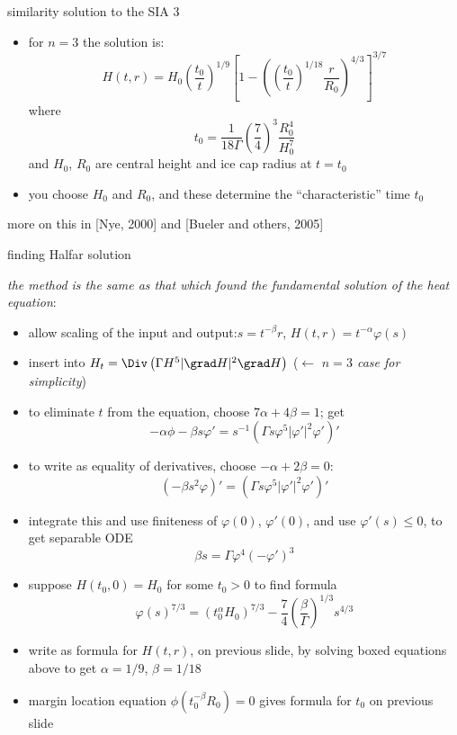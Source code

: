 \begin{frame}{similarity solution to the SIA 3}

\begin{itemize}
\item for $n=3$ the solution is:
  $$H(t,r) = H_0 \left(\frac{t_0}{t}\right)^{1/9} \left[1 - \left(\left(\frac{t_0}{t}\right)^{1/18} \frac{r}{R_0}\right)^{4/3}\right]^{3/7}$$
where
  $$t_0 = \frac{1}{18 \Gamma} \left(\frac{7}{4}\right)^3 \frac{R_0^4}{H_0^{7}}$$
and $H_0$, $R_0$ are central height and ice cap radius at $t=t_0$
\item you choose $H_0$ and $R_0$, and these determine the ``characteristic'' time $t_0$
\end{itemize}

\begin{center}
\tiny  more on this in [Nye, 2000] and [Bueler and others, 2005]
\end{center}
\end{frame}


\begin{frame}{finding Halfar solution}

\small
\emph{the method is the same as that which found the fundamental solution of the heat equation}:
\begin{itemize}
\item allow scaling of the input and output:\qquad  $s = t^{-\beta} r$, \quad $H(t,r) = t^{-\alpha} \varphi(s)$
\item insert into $H_t = \Div \left(\Gamma H^{5} |\grad H|^{2} \grad H \right)$ \qquad\qquad ($\leftarrow$ \emph{$n=3$ case for simplicity})
\item to eliminate $t$ from the equation, choose $\boxed{7\alpha + 4\beta = 1}$; get
	$$-\alpha \phi - \beta s \varphi' = s^{-1} \left(\Gamma s \varphi^5 |\varphi'|^2\varphi'\right)'$$
\item to write as equality of derivatives, choose $\boxed{-\alpha + 2\beta=0}$:
	$$\left(-\beta s^2 \varphi\right)' = \left(\Gamma s \varphi^5 |\varphi'|^2\varphi'\right)'$$
\item integrate this and use finiteness of $\varphi(0)$, $\varphi'(0)$, and use $\varphi'(s)\le 0$, to get separable ODE
	$$\beta s = \Gamma \varphi^4 (-\varphi')^3$$
\item suppose $H(t_0,0)=H_0$ for some $t_0>0$ to find formula
	$$\varphi(s)^{7/3} = (t_0^\alpha H_0)^{7/3} - \frac{7}{4} \left(\frac{\beta}{\Gamma}\right)^{1/3} s^{4/3}$$
\item write as formula for $H(t,r)$, on previous slide, by solving boxed equations above to get $\alpha=1/9$, $\beta = 1/18$
\item margin location equation $\phi(t_0^{-\beta} R_0)=0$ gives formula for $t_0$ on previous slide
\end{itemize}
\end{frame}


